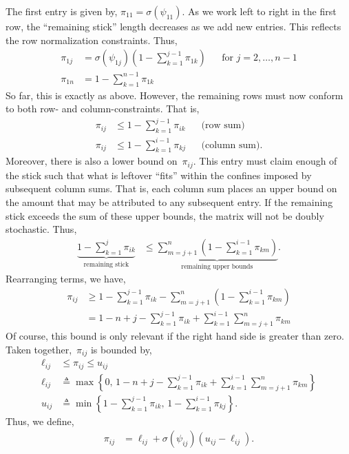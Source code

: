 \documentclass{article}
\begin{document}
The first entry is given by, ${\pi}_{11} = \sigma(\psi_{11})$.
As we work left to right in the first row, the ``remaining stick'' length
decreases as we add new entries. This reflects the row normalization constraints.
Thus,
\begin{align}
  {\pi}_{1j} &= \sigma(\psi_{1j}) (1 - \sum_{k=1}^{j-1} {\pi}_{1k})  & &  \text{for } j=2, \ldots, n-1\\
  {\pi}_{1n} &= 1 - \sum_{k=1}^{n-1} {\pi}_{1k}
\end{align}
So far, this is exactly as above. However, the remaining rows must now
conform to both row- and column-constraints. That is,
\begin{align}
{\pi}_{ij} &\leq 1- \sum_{k=1}^{j-1} {\pi}_{ik} & & \text{(row sum)} \\
{\pi}_{ij} &\leq 1- \sum_{k=1}^{i-1} {\pi}_{kj} & & \text{(column sum)}.
\end{align}
Moreover, there is also a lower bound on~${\pi}_{ij}$. This entry must
claim enough of the stick such that what is leftover ``fits'' within the confines
imposed by subsequent column sums. That is, each column sum places an upper
bound on the amount that may be attributed to any subsequent entry. If the remaining
stick exceeds the sum of these upper bounds, the matrix will not be doubly stochastic.
Thus,
\begin{align}
\underbrace{1 - \sum_{k=1}^j \pi_{ik}}_{\text{remaining stick}}
&\leq \underbrace{\sum_{m=j+1}^n (1- \sum_{k=1}^{i-1} {\pi}_{km})}_{\text{remaining upper bounds}}.
\end{align}
Rearranging terms, we have,
\begin{align}
\pi_{ij} &\geq 1- \sum_{k=1}^{j-1} \pi_{ik} - \sum_{m=j+1}^n (1- \sum_{k=1}^{i-1} {\pi}_{km}) \\
&= 1 - n + j - \sum_{k=1}^{j-1} \pi_{ik}  +  \sum_{k=1}^{i-1} \sum_{m=j+1}^n {\pi}_{km}
\end{align}
Of course, this bound is only relevant if the right hand side is greater than zero.
Taken together,~${\pi}_{ij}$ is bounded by,
\begin{align}
\ell_{ij} &\leq
{\pi}_{ij}
\leq
u_{ij}
\\
\ell_{ij} &\triangleq \max \left \{0, \, 1 - n + j - \sum_{k=1}^{j-1} {\pi}_{ik}  +  \sum_{k=1}^{i-1} \sum_{m=j+1}^n {\pi}_{km} \right \}
\\
u_{ij} &\triangleq 
\min \left \{1- \sum_{k=1}^{j-1} {\pi}_{ik}, \,
1- \sum_{k=1}^{i-1} {\pi}_{kj} \right\}.
\end{align}
Thus, we define,
\begin{align}
  {\pi}_{ij} &= \ell_{ij} + \sigma(\psi_{ij}) (u_{ij} - \ell_{ij}).
\end{align}
\end{document}
